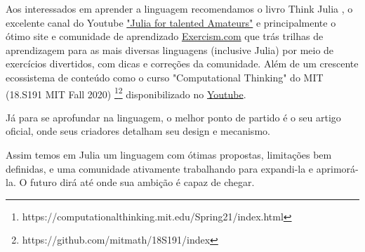 Aos interessados em aprender a linguagem recomendamos o livro Think Julia \cite{Lauwens2019}, o excelente canal do Youtube \href{https://www.youtube.com/c/juliafortalentedamateurs}{"Julia for talented Amateurs"} e principalmente o ótimo site e comunidade de aprendizado \href{https://exercism.org/tracks/julia}{Exercism.com} que trás trilhas de aprendizagem para as mais diversas linguagens (inclusive Julia) por meio de exercícios divertidos, com dicas e correções da comunidade. Além de um crescente ecossistema de conteúdo como o curso "Computational Thinking" do MIT (18.S191 MIT Fall 2020) \footnote{https://computationalthinking.mit.edu/Spring21/index.html}\footnote{https://github.com/mitmath/18S191/index} disponibilizado no \href{https://www.youtube.com/playlist?list=PLP8iPy9hna6Q2Kr16aWPOKE0dz9OnsnIJ}{Youtube}.

Já para se aprofundar na linguagem, o melhor ponto de partido é o seu artigo oficial, onde seus criadores detalham seu design e mecanismo. \cite{Bezanson2017}

Assim temos em Julia um linguagem com ótimas propostas, limitações bem definidas, e uma comunidade ativamente trabalhando para expandi-la e aprimorá-la. O futuro dirá até onde sua ambição é capaz de chegar. 
